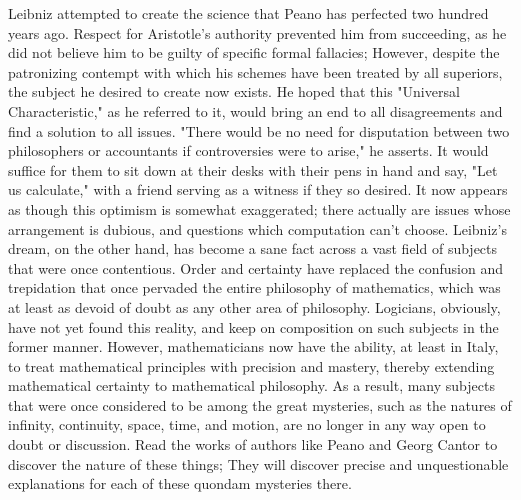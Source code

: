 \documentclass[a4paper,12pt]{book}[2004/02/16]
\theoremstyle{ilemma}
\theoremstyle{itheorem}
\theoremstyle{iother}
\theoremstyle{icorollary}
\theoremstyle{numcorollary}
\theoremstyle{idefinition}
\begin{document}
Leibniz attempted to create the science that Peano has perfected two hundred years ago. Respect for Aristotle's authority prevented him from succeeding, as he did not believe him to be guilty of specific formal fallacies; However, despite the patronizing contempt with which his schemes have been treated by all superiors, the subject he desired to create now exists. He hoped that this "Universal Characteristic," as he referred to it, would bring an end to all disagreements and find a solution to all issues. "There would be no need for disputation between two philosophers or accountants if controversies were to arise," he asserts. It would suffice for them to sit down at their desks with their pens in hand and say, "Let us calculate," with a friend serving as a witness if they so desired. It now appears as though this optimism is somewhat exaggerated; there actually are issues whose arrangement is
dubious, and questions which computation can't choose. Leibniz's dream, on the other hand, has become a sane fact across a vast field of subjects that were once contentious. Order and certainty have replaced the confusion and trepidation that once pervaded the entire philosophy of mathematics, which was at least as devoid of doubt as any other area of philosophy. Logicians, obviously, have not yet found
this reality, and keep on composition on such subjects in the former manner. However, mathematicians now have the ability, at least in Italy, to treat mathematical principles with precision and mastery, thereby extending mathematical certainty to mathematical philosophy. As a result, many subjects that were once considered to be among the great mysteries, such as the natures of infinity, continuity, space, time, and motion, are no longer in any way open to doubt or discussion. Read the works of authors like Peano and Georg Cantor to discover the nature of these things; They will discover precise and unquestionable explanations for each of these quondam mysteries there.
\end{document}
